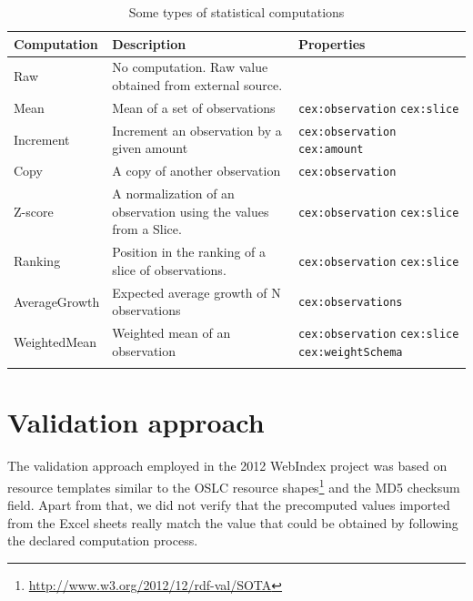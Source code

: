 \documentclass{acm_proc_article-sp}
\newcommand{\footnoteUrl}[1]{\footnote{\url{#1}}}
\begin{document}
\begin{table}[t]
\label{table:computations}
\begin{center}
\begin{tabular}{ p{} p{} p{}}
\toprule
Computation & Description & Properties \\
\hline
Raw			& No computation. Raw value obtained from external source.
			&  \\
Mean	    & Mean of a set of observations 
			& \lstinline|cex:observation| \newline 
			  \lstinline|cex:slice| \\
Increment	& Increment an observation by a given amount 
			& \lstinline|cex:observation| \newline 
			  \lstinline|cex:amount|  \\
Copy		& A copy of another observation 
			& \lstinline|cex:observation| \\
Z-score		& A normalization of an observation using the values from a Slice. 
			& \lstinline|cex:observation| \newline 
			  \lstinline|cex:slice| \\
Ranking		& Position in the ranking of a slice of observations. 
			& \lstinline|cex:observation| \newline 
			  \lstinline|cex:slice| \\
AverageGrowth & Expected average growth of N observations
			  & \lstinline|cex:observations| \\
WeightedMean & Weighted mean of an observation
			& \lstinline|cex:observation| \newline
			  \lstinline|cex:slice|       \newline
			  \lstinline|cex:weightSchema| \\
\bottomrule\\
\end{tabular}
\caption{Some types of statistical computations}
\end{center}
\end{table}

\section{Validation approach}

The validation approach employed in the 2012 WebIndex project was based on
 resource templates similar to the OSLC resource
 shapes\footnoteUrl{http://www.w3.org/2012/12/rdf-val/SOTA} and
 the MD5 checksum field. 
 Apart from that, we did not verify that the precomputed values imported from
 the Excel sheets really match the value that could be obtained by 
 following the declared computation process.
\end{document}
